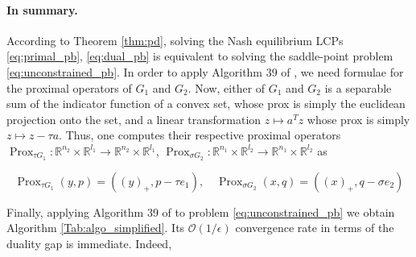 \documentclass{article} %
\DeclareMathOperator{\proj}{proj}
\DeclareMathOperator{\prox}{Prox}
\begin{document}

\paragraph{In summary.}
According to Theorem \ref{thm:pd}, solving the Nash equilibrium LCPs
\eqref{eq:primal_pb}, \eqref{eq:dual_pb} is equivalent to solving the
saddle-point problem \eqref{eq:unconstrained_pb}.
In order to apply Algorithm 39 of \cite{chambolle2010}, we need
formulae for the proximal operators of
$G_1$ and $G_2$. Now, either of $G_1$ and $G_2$ is a separable sum of
the indicator function of a convex set, whose prox is simply the
euclidean projection onto the set,  and a linear transformation $z
\mapsto a^Tz$ whose prox is simply $z \mapsto z - \tau a$. Thus,  one
computes their respective proximal operators $\prox_{\tau G_1} :
\mathbb{R}^{n_2} \times \mathbb{R}^{l_1} \rightarrow \mathbb{R}^{n_2}
\times \mathbb{R}^{l_1}$, $\prox_{\sigma G_2}: \mathbb{R}^{n_1} \times
\mathbb{R}^{l_2} \rightarrow \mathbb{R}^{n_1} \times \mathbb{R}^{l_2}$
as

  \begin{equation}
    \prox_{\tau G_1}(y, p) = ((y)_+, p - \tau e_1), \hspace{1em}
    \prox_{\sigma G_2}(x, q) = ((x)_+, q - \sigma e_2)
  \end{equation}

Finally, applying Algorithm 39 of \cite{chambolle2010} to problem \eqref{eq:unconstrained_pb} we obtain Algorithm \ref{Tab:algo_simplified}. Its $\mathcal{O}(1/\epsilon)$ convergence rate in terms of the duality gap is immediate. Indeed,
\end{document}
